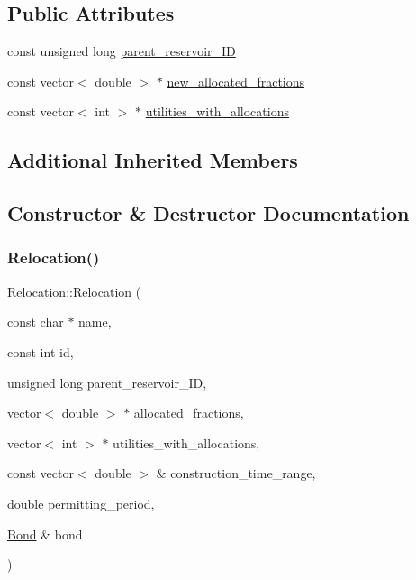 \subsection*{Public Attributes}
\begin{DoxyCompactItemize}
\item 
const unsigned long \mbox{\hyperlink{classRelocation_a61282254064f00641aaec667a7eb0652}{parent\+\_\+reservoir\+\_\+\+ID}}
\item 
const vector$<$ double $>$ $\ast$ \mbox{\hyperlink{classRelocation_acc95d1be560fed2b4a1b4b2ae605ae67}{new\+\_\+allocated\+\_\+fractions}}
\item 
const vector$<$ int $>$ $\ast$ \mbox{\hyperlink{classRelocation_ae426f390487b6b67f19bfbf556c922c2}{utilities\+\_\+with\+\_\+allocations}}
\end{DoxyCompactItemize}
\subsection*{Additional Inherited Members}


\subsection{Constructor \& Destructor Documentation}
\mbox{\label{classRelocation_abeada1f0c797d8992c1e6a200b571574}} 
\subsubsection{\texorpdfstring{Relocation()}{Relocation()}\hspace{0.1cm}{\footnotesize\ttfamily [1/2]}}
{\footnotesize\ttfamily Relocation\+::\+Relocation (\begin{DoxyParamCaption}\item[{const char $\ast$}]{name,  }\item[{const int}]{id,  }\item[{unsigned long}]{parent\+\_\+reservoir\+\_\+\+ID,  }\item[{vector$<$ double $>$ $\ast$}]{allocated\+\_\+fractions,  }\item[{vector$<$ int $>$ $\ast$}]{utilities\+\_\+with\+\_\+allocations,  }\item[{const vector$<$ double $>$ \&}]{construction\+\_\+time\+\_\+range,  }\item[{double}]{permitting\+\_\+period,  }\item[{\mbox{\hyperlink{classBond}{Bond}} \&}]{bond }\end{DoxyParamCaption})}

